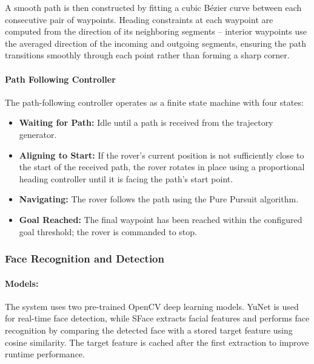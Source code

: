 \documentclass[12pt,a4paper,twocolumn]{article}
\begin{document}
A smooth path is then constructed by fitting a cubic B\'{e}zier curve between each consecutive pair of waypoints. Heading constraints at each waypoint are computed from the direction of its neighboring segments -- interior waypoints use the averaged direction of the incoming and outgoing segments, ensuring the path transitions smoothly through each point rather than forming a sharp corner. 

\paragraph{Path Following Controller}
The path-following controller operates as a finite state machine with four states:
\begin{itemize}
\setlength{\itemsep}{1pt}
\setlength{\parskip}{0pt}
\setlength{\parsep}{0pt}
\item \textbf{Waiting for Path:} Idle until a path is received from the trajectory generator.
\item \textbf{Aligning to Start:} If the rover's current position is not sufficiently close to the start of the received path, the rover rotates in place using a proportional heading controller until it is facing the path's start point.
\item \textbf{Navigating:} The rover follows the path using the Pure Pursuit algorithm.
\item \textbf{Goal Reached:} The final waypoint has been reached within the configured goal threshold; the rover is commanded to stop.
\end{itemize}


\subsubsection{Face Recognition and Detection}
\paragraph{Models:}
The system uses two pre-trained OpenCV deep learning models. YuNet is used for real-time face detection, while SFace extracts facial features and performs face recognition by comparing the detected face with a stored target feature using cosine similarity. The target feature is cached after the first extraction to improve runtime performance.
\end{document}
